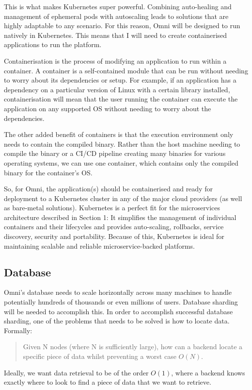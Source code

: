 This is what makes Kubernetes super powerful. Combining auto-healing and management of ephemeral pods with autoscaling leads to solutions that are highly adaptable to any scenario.
For this reason, Omni will be designed to run natively in Kubernetes. This means that I will need to create containerised applications to run the platform.

Containerisation is the process of modifying an application to run within a container. A container is a self-contained module that can be run without needing to worry about its dependencies or setup. For example, if an application has a dependency on a particular version of Linux with a certain library installed, containerisation will mean that the user running the container can execute the application on any supported OS without needing to worry about the dependencies.

The other added benefit of containers is that the execution environment only needs to contain the compiled binary. Rather than the host machine needing to compile the binary or a CI/CD pipeline creating many binaries for various operating systems, we can use one container, which contains only the compiled binary for the container's OS.

So, for Omni, the application(s) should be containerised and ready for deployment to a Kubernetes cluster in any of the major cloud providers (as well as bare-metal solutions).
Kubernetes is a perfect fit for the microservices architecture described in Section 1: It simplifies the management of individual containers and their lifecycles and provides auto-scaling, rollbacks, service discovery, security and portability. Because of this, Kubernetes is ideal for maintaining scalable and reliable microservice-backed platforms.

\subsection{Database}
\label{sec:design-system-database}
Omni's database needs to scale horizontally across many machines to handle potentially hundreds of thousands or even millions of users. Database sharding will be needed to accomplish this. 
In order to accomplish successful database sharding, one of the problems that needs to be solved is how to locate data. Formally:
\begin{quotation} %
Given N nodes (where N is sufficiently large), how can a backend locate a specific piece of data whilst preventing a worst case $O(N)$.
\end{quotation}
Ideally, we want data retrieval to be of the order $O(1)$, where a backend knows exactly where to look to find a piece of data that we want to retrieve.

